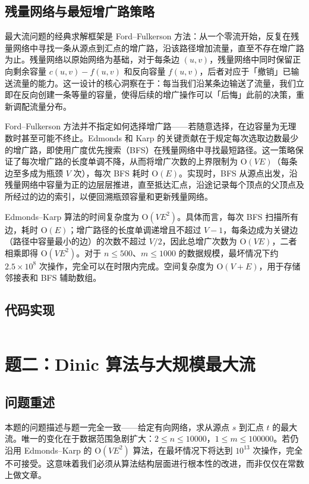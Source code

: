 \documentclass[12pt, a4paper]{academics}
\begin{document}
\subsection{残量网络与最短增广路策略}

最大流问题的经典求解框架是 Ford--Fulkerson 方法：从一个零流开始，反复在残量网络中寻找一条从源点到汇点的增广路，沿该路径增加流量，直至不存在增广路为止。残量网络以原始网络为基础，对于每条边 $(u, v)$，残量网络中同时保留正向剩余容量 $c(u, v) - f(u, v)$ 和反向容量 $f(u, v)$，后者对应于「撤销」已输送流量的能力。这一设计的核心洞察在于：每当我们沿某条边输送了流量，我们立即在反向创建一条等量的容量，使得后续的增广操作可以「后悔」此前的决策，重新调配流量分布。

Ford--Fulkerson 方法并不指定如何选择增广路——若随意选择，在边容量为无理数时甚至可能不终止。Edmonds 和 Karp 的关键贡献在于规定每次选取边数最少的增广路，即使用广度优先搜索（BFS）在残量网络中寻找最短路径。这一策略保证了每次增广路的长度单调不降，从而将增广次数的上界限制为 $\mathrm{O}(VE)$（每条边至多成为瓶颈 $V$ 次），每次 BFS 耗时 $\mathrm{O}(E)$。实现时，BFS 从源点出发，沿残量网络中容量为正的边层层推进，直至抵达汇点，沿途记录每个顶点的父顶点及所经过的边的索引，以便回溯瓶颈容量和更新残量网络。

Edmonds--Karp 算法的时间复杂度为 $\mathrm{O}(VE^2)$。具体而言，每次 BFS 扫描所有边，耗时 $\mathrm{O}(E)$；增广路径的长度单调递增且不超过 $V-1$，每条边成为关键边（路径中容量最小的边）的次数不超过 $V/2$，因此总增广次数为 $\mathrm{O}(VE)$，二者相乘即得 $\mathrm{O}(VE^2)$。对于 $n \le 500$、$m \le 1000$ 的数据规模，最坏情况下约 $2.5 \times 10^8$ 次操作，完全可以在时限内完成。空间复杂度为 $\mathrm{O}(V + E)$，用于存储邻接表和 BFS 辅助数组。

\subsection{代码实现}

\inputminted{c++}{../src/p1_edmonds_karp.cpp}

\section{题二：Dinic 算法与大规模最大流}

\subsection{问题重述}

本题的问题描述与题一完全一致——给定有向网络，求从源点 $s$ 到汇点 $t$ 的最大流。唯一的变化在于数据范围急剧扩大：$2 \le n \le 10000$，$1 \le m \le 100000$。若仍沿用 Edmonds--Karp 的 $\mathrm{O}(VE^2)$ 算法，在最坏情况下将达到 $10^{13}$ 次操作，完全不可接受。这意味着我们必须从算法结构层面进行根本性的改进，而非仅仅在常数上做文章。
\end{document}

